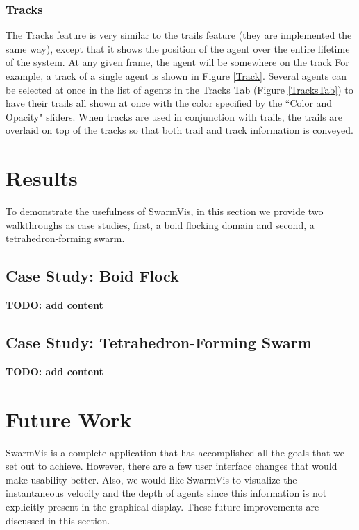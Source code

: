 \documentclass[conference]{IEEEtran}
\begin{document}
\subsubsection{Tracks}

The Tracks feature is very similar to the trails feature
(they are implemented the same way), except that it shows the position of the agent over the entire
lifetime of the system. At any given frame, the agent will be somewhere on the track
For example, a track of a single agent is shown in Figure \ref{Track}.
Several agents can be selected at once in the list of agents in the Tracks Tab (Figure \ref{TracksTab}) to
have their trails all shown at once with the color specified by the ``Color and Opacity" sliders.
When tracks are used in conjunction with trails, the trails are overlaid on top of the tracks so that
both trail and track information is conveyed.

\section{Results}

To demonstrate the usefulness of SwarmVis, in this section we provide two walkthroughs as case studies, first,
a boid flocking domain and second, a tetrahedron-forming swarm.

\subsection{Case Study: Boid Flock}

\textbf{TODO: add content}

\subsection{Case Study: Tetrahedron-Forming Swarm}

\textbf{TODO: add content}

\section{Future Work}
SwarmVis is a complete application that has accomplished all the goals that we set out to achieve. 
However, there are a few user interface changes that would make usability better.
Also, we would like SwarmVis to visualize the instantaneous velocity and the depth of
agents since this information is not explicitly present in the
graphical display. These future improvements are discussed in this section.
\end{document}
